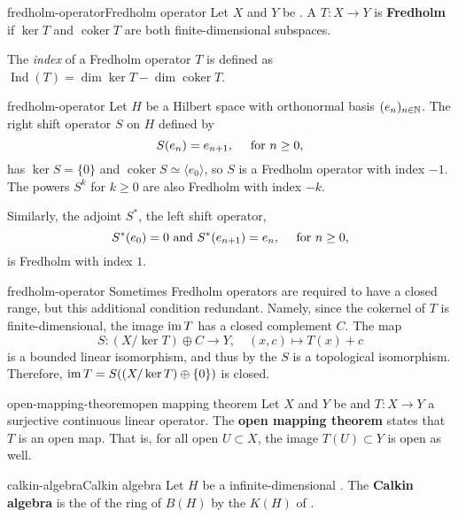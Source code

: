 \begin{topic}{fredholm-operator}{Fredholm operator}
    Let $X$ and $Y$ be . A  $T : X \to Y$ is \textbf{Fredholm} if $\ker T$ and $\operatorname{coker} T$ are both finite-dimensional subspaces.
    
    The \textit{index} of a Fredholm operator $T$ is defined as $\operatorname{Ind}(T) = \dim \ker T - \dim \operatorname{coker} T$.
\end{topic}

\begin{example}{fredholm-operator}
    Let $H$ be a Hilbert space with orthonormal basis $(e_n)_{n \in \mathbb{N}}$. The right shift operator $S$ on $H$ defined by
    \[ S(e_n) = e_{n + 1}, \quad \textup{ for } n \ge 0 , \]
    has $\ker S = \{ 0 \}$ and $\operatorname{coker} S \simeq \langle e_0 \rangle$, so $S$ is a Fredholm operator with index $-1$. The powers $S^k$ for $k \ge 0$ are also Fredholm with index $-k$.
    
    Similarly, the adjoint $S^*$, the left shift operator,
    \[ S^*(e_0) = 0 \text{ and } S^*(e_{n + 1}) = e_n, \quad \textup { for } n \ge 0 , \]
    is Fredholm with index $1$.
\end{example}

\begin{example}{fredholm-operator}
    Sometimes Fredholm operators are required to have a closed range, but this additional condition redundant. Namely, since the cokernel of $T$ is finite-dimensional, the image $\operatorname{im} T$ has a closed complement $C$. The map
    \[ S : (X / \ker T) \oplus C \to Y, \quad (x, c) \mapsto T(x) + c \]
    is a bounded linear isomorphism, and thus by the  $S$ is a topological isomorphism. Therefore, $\operatorname{im} T = S((X / \ker T) \oplus \{ 0 \})$ is closed.
\end{example}

\begin{topic}{open-mapping-theorem}{open mapping theorem}
    Let $X$ and $Y$ be  and $T : X \to Y$ a surjective continuous linear operator. The \textbf{open mapping theorem} states that $T$ is an open map. That is, for all open $U \subset X$, the image  $T(U) \subset Y$ is open as well.
\end{topic}

\begin{topic}{calkin-algebra}{Calkin algebra}
    Let $H$ be a  infinite-dimensional . The \textbf{Calkin algebra} is the  of the ring of  $B(H)$ by the  $K(H)$ of .
\end{topic}

